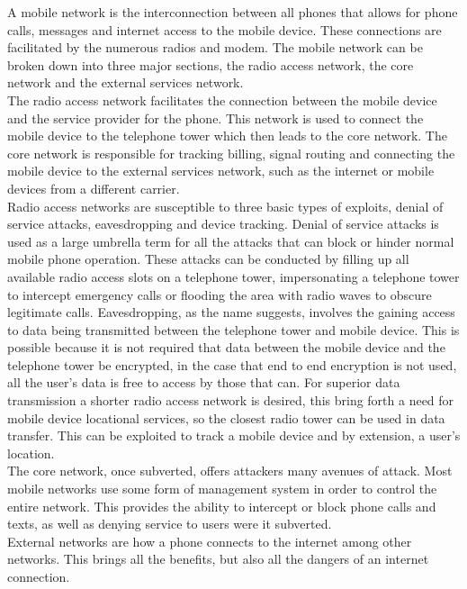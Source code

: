A mobile network is the interconnection between all phones that allows for phone calls, messages and internet access to the mobile device.
These connections are facilitated by the numerous radios and modem.
The mobile network can be broken down into three major sections, the radio access network, the core network and the external services network.\\
The radio access network facilitates the connection between the mobile device and the service provider for the phone.
This network is used to connect the mobile device to the telephone tower which then leads to the core network.
The core network is responsible for tracking billing, signal routing and connecting the mobile device to the external services network, such as the internet or mobile devices from a different carrier.\cite{Reference13}\\ 
Radio access networks are susceptible to three basic types of exploits, denial of service attacks, eavesdropping and device tracking.
Denial of service attacks is used as a large umbrella term for all the attacks that can block or hinder normal mobile phone operation.
These attacks can be conducted by filling up all available radio access slots on a telephone tower, impersonating a telephone tower to intercept emergency calls or flooding the area with radio waves to obscure legitimate calls.\cite{Reference17}
Eavesdropping, as the name suggests, involves the gaining access to data being transmitted between the telephone tower and mobile device.
This is possible because it is not required that data between the mobile device and the telephone tower be encrypted, in the case that end to end encryption is not used, all the user’s data is free to access by those that can.\cite{Reference13}
For superior data transmission a shorter radio access network is desired, this bring forth a need for mobile device locational services, so the closest radio tower can be used in data transfer.
This can be exploited to track a mobile device and by extension, a user’s location.\cite{Reference17}\\
The core network, once subverted, offers attackers many avenues of attack.
Most mobile networks use some form of management system in order to control the entire network.
This provides the ability to intercept or block phone calls and texts, as well as denying service to users were it subverted.\cite{Reference13}\\
External networks are how a phone connects to the internet among other networks.
This brings all the benefits, but also all the dangers of an internet connection.\\
